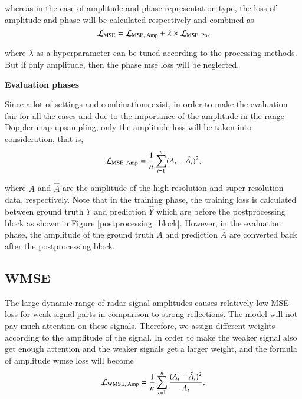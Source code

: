 whereas in the case of amplitude and phase representation type, the loss of amplitude and phase will be calculated respectively and combined as
\begin{equation}
    \centering
    \mathcal{L}_{\text{MSE}} = \mathcal{L}_{\text{MSE, Amp}} + \lambda \times \mathcal{L}_{\text{MSE, Ph}},
\end{equation}

where $\lambda$ as a hyperparameter can be tuned according to the processing methods. But if only amplitude, then the phase \gls{mse} loss will be neglected.

\begin{spacing}{1.5}
\textbf{\large{Evaluation phases}}
\end{spacing}
Since a lot of settings and combinations exist, in order to make the evaluation fair for all the cases and due to the importance of the amplitude in the range-Doppler map upsampling, only the amplitude loss will be taken into consideration, that is,
\begin{equation}
    \centering
    \mathcal{L}_{\text{MSE, Amp}} = \frac{1}{n} \sum_{i=1}^{n} (A_i - \hat{A}_i)^2,
\end{equation}

where $A$ and $\hat{A}$ are the amplitude of the high-resolution and super-resolution data, respectively. Note that in the training phase, the training loss is calculated between ground truth $Y$ and prediction $\hat{Y}$ which are before the postprocessing block as shown in Figure \ref{postprocessing_block}. However, in the evaluation phase, the amplitude of the ground truth $A$ and prediction $\hat{A}$ are converted back after the postprocessing block.

\subsection{WMSE}
The large dynamic range of radar signal amplitudes  causes relatively low MSE loss for weak signal parts in comparison to strong reflections. The model will not pay much attention on these signals. Therefore, we assign different weights according to the amplitude of the signal. In order to make the weaker signal also get enough attention and the weaker signals get a larger weight, and the formula of amplitude \gls{wmse} loss will become
\begin{equation}
    \centering
    \mathcal{L}_{\text{WMSE, Amp}} = \frac{1}{n} \sum_{i=1}^{n} \frac{(A_i - \hat{A}_i)^2}{A_i},
    \label{amplitude wmse loss equation}
\end{equation}

